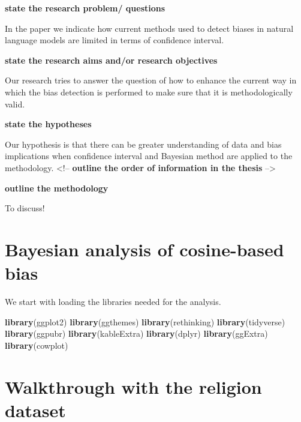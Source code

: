 \documentclass[]{book}
\newenvironment{Shaded}{\begin{snugshade}}{\end{snugshade}}
\newcommand{\KeywordTok}[1]{\textcolor[rgb]{0.13,0.29,0.53}{\textbf{#1}}}
\newcommand{\NormalTok}[1]{#1}
\begin{document}
\textbf{state the research problem/ questions}

In the paper we indicate how current methods used to detect biases in
natural language models are limited in terms of confidence interval.
\newline

\textbf{state the research aims and/or research objectives}

Our research tries to answer the question of how to enhance the current
way in which the bias detection is performed to make sure that it is
methodologically valid. \newline

\textbf{state the hypotheses}

Our hypothesis is that there can be greater understanding of data and
bias implications when confidence interval and Bayesian method are
applied to the methodology. \newline
<!-- \textbf{outline the order of information in the thesis} -->

\textbf{outline the methodology}

To discuss!

\chapter{Bayesian analysis of cosine-based
bias}\label{bayesian-analysis-of-cosine-based-bias}

We start with loading the libraries needed for the analysis.

\footnotesize

\begin{Shaded}
\begin{Highlighting}[]
\KeywordTok{library}\NormalTok{(ggplot2)}
\KeywordTok{library}\NormalTok{(ggthemes)}
\KeywordTok{library}\NormalTok{(rethinking)}
\KeywordTok{library}\NormalTok{(tidyverse)}
\KeywordTok{library}\NormalTok{(ggpubr)}
\KeywordTok{library}\NormalTok{(kableExtra)}
\KeywordTok{library}\NormalTok{(dplyr)}
\KeywordTok{library}\NormalTok{(ggExtra)}
\KeywordTok{library}\NormalTok{(cowplot)}
\end{Highlighting}
\end{Shaded}

\normalsize 

\chapter{Walkthrough with the religion
dataset}\label{walkthrough-with-the-religion-dataset}
\end{document}
